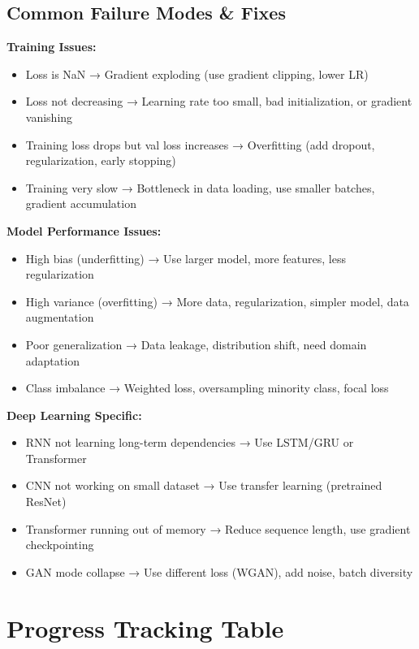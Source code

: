 \documentclass[10pt]{article}
\begin{document}
\subsection{Common Failure Modes \& Fixes}

\textbf{Training Issues:}
\begin{itemize}
\item Loss is NaN → Gradient exploding (use gradient clipping, lower LR)
\item Loss not decreasing → Learning rate too small, bad initialization, or gradient vanishing
\item Training loss drops but val loss increases → Overfitting (add dropout, regularization, early stopping)
\item Training very slow → Bottleneck in data loading, use smaller batches, gradient accumulation
\end{itemize}

\textbf{Model Performance Issues:}
\begin{itemize}
\item High bias (underfitting) → Use larger model, more features, less regularization
\item High variance (overfitting) → More data, regularization, simpler model, data augmentation
\item Poor generalization → Data leakage, distribution shift, need domain adaptation
\item Class imbalance → Weighted loss, oversampling minority class, focal loss
\end{itemize}

\textbf{Deep Learning Specific:}
\begin{itemize}
\item RNN not learning long-term dependencies → Use LSTM/GRU or Transformer
\item CNN not working on small dataset → Use transfer learning (pretrained ResNet)
\item Transformer running out of memory → Reduce sequence length, use gradient checkpointing
\item GAN mode collapse → Use different loss (WGAN), add noise, batch diversity
\end{itemize}

\newpage

\section{Progress Tracking Table}
\end{document}
